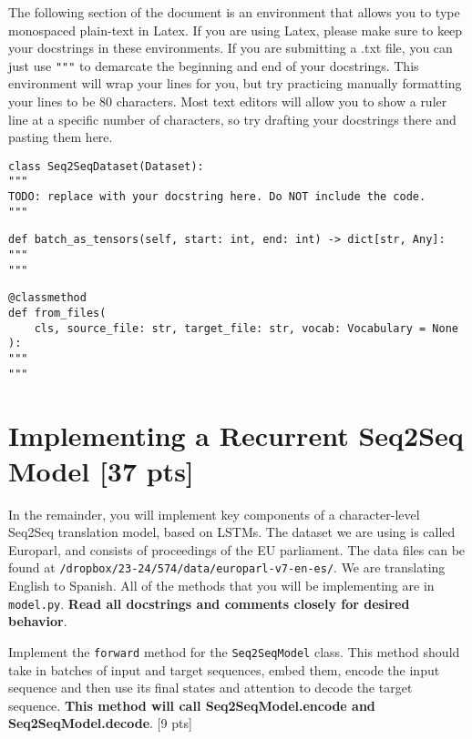 \documentclass[11pt]{article}
\begin{document}
The following section of the document is an environment that allows you to type monospaced plain-text in Latex. If you are using Latex, please make sure to keep your docstrings in these environments. If you are submitting a .txt file, you can just use \texttt{"""} to demarcate the beginning and end of your docstrings. This environment will wrap your lines for you, but try practicing manually formatting your lines to be 80 characters. Most text editors will allow you to show a ruler line at a specific number of characters, so try drafting your docstrings there and pasting them here.

\begin{lstlisting}
class Seq2SeqDataset(Dataset):
"""
TODO: replace with your docstring here. Do NOT include the code.
"""
\end{lstlisting}

\begin{lstlisting}
def batch_as_tensors(self, start: int, end: int) -> dict[str, Any]:
"""
"""
\end{lstlisting}

\begin{lstlisting}
@classmethod
def from_files(
    cls, source_file: str, target_file: str, vocab: Vocabulary = None
):
"""
"""
\end{lstlisting}

\section{Implementing a Recurrent Seq2Seq Model [37 pts]}

In the remainder, you will implement key components of a character-level Seq2Seq translation model, based on LSTMs. The dataset we are using is called Europarl, and consists of proceedings of the EU parliament. The data files can be found at \texttt{/dropbox/23-24/574/data/europarl-v7-en-es/}. We are translating English to Spanish. All of the methods that you will be implementing are in \texttt{model.py}. \textbf{Read all docstrings and comments closely for desired behavior}.

\vspace{2em}
 Implement the \texttt{forward} method for the \texttt{Seq2SeqModel} class. This method should take in batches of input and target sequences, embed them, encode the input sequence and then use its final states and attention to decode the target sequence. \textbf{This method will call Seq2SeqModel.encode and Seq2SeqModel.decode}. \hfill [9 pts]
\end{document}
